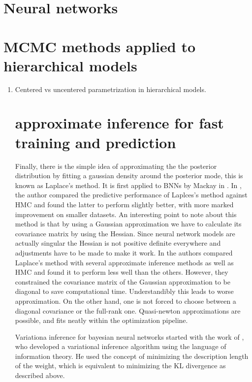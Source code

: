 \documentclass[12pt]{report}
\begin{document}
\section{Neural networks} 



\section{MCMC methods applied to hierarchical models}
\begin{enumerate}
\item Centered vs uncentered parametrization in hierarchical models.







\section{approximate inference for fast training and prediction}


Finally, there is the simple idea of approximating the the posterior
distribution by fitting a gaussian density around the posterior mode, this is
known as Laplace's method. It is first applied to BNNs by Mackay in \cite{mackay1992evidence}. In \cite{vivarelli2001comparing}, the author compared the predictive performance of Laplces's method against HMC and found the latter to perform slightly better, with more marked improvement on smaller datasets. An interesting point to note about this method is that by using a Gaussian approximation we have to calculate its covariance matrix by using the Hessian. Since neural network models are actually singular the Hessian is not positive definite everywhere and adjustments have to be made to make it work. In \cite{hernandez2015probabilistic} the authors compared Laplace's method with several approximate inference methods as well as HMC and found it to perform less well than the others. However, they constrained the covariance matrix of the Gaussian approximation to be diagonal to save computational time. Understandibly this leads to worse approximation. On the other hand, one is not forced to choose between a diagonal covariance or the full-rank one. Quasi-newton approximations are possible, and fits neatly within the optimization pipeline.

Variationa inference for bayesian neural networks started with the work of \cite{hinton1993keeping}, who developed a variational inference algorithm using the language of information theory. He used the concept of minimizing the description length of the weight, which is equivalent to minimizing the KL divergence as described above. 


\end{enumerate}
\end{document}
